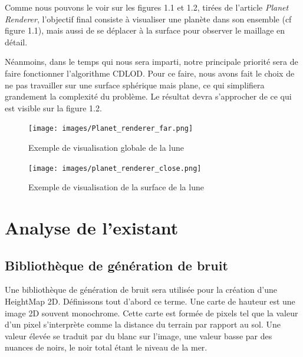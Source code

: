\documentclass[12pt]{report}
\begin{document}
Comme nous pouvons le voir sur les figures 1.1 et 1.2, tirées de l'article \textit{Planet Renderer}, l'objectif final consiste à visualiser une planète dans son ensemble (cf figure 1.1), mais aussi de se déplacer à la surface pour observer le maillage en détail.

Néanmoins, dans le temps qui nous sera imparti, notre principale priorité sera de faire fonctionner l'algorithme CDLOD. Pour ce faire, nous avons fait le choix de ne pas travailler sur une surface sphérique mais plane, ce qui simplifiera grandement la complexité du problème. Le résultat devra s'approcher de ce qui est visible sur la figure 1.2.


\vspace{0.3cm}

\begin{figure}[h]
    \begin{center}
    \texttt{[image: images/Planet\_renderer\_far.png]}
    \caption{Exemple de visualisation globale de la lune}
    \end{center}
\end{figure}

\begin{figure}[h]
  \centering
  \begin{center}
  \texttt{[image: images/planet\_renderer\_close.png]}
  \caption{Exemple de visualisation de la surface de la lune}
  \end{center}
\end{figure}

\newpage

\chapter{Analyse de l'existant}

\section{Bibliothèque de génération de bruit}

Une bibliothèque de génération de bruit sera utilisée pour la création d'une HeightMap 2D. Définissons tout d'abord ce terme. Une carte de hauteur est une image 2D souvent monochrome. Cette carte est formée de pixels tel que la valeur d'un pixel s'interprète comme la distance du terrain par rapport au sol. Une valeur élevée se traduit par du blanc sur l'image, une valeur basse par des nuances de noirs, le noir total étant le niveau de la mer.
\end{document}

